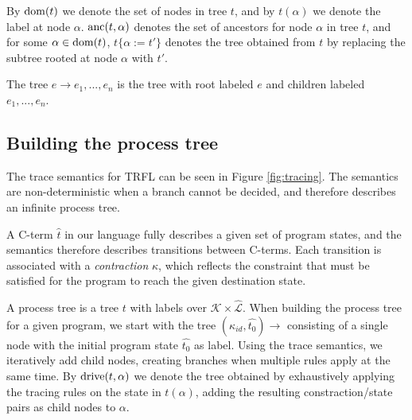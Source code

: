 \documentclass[10pt]{../sigplanconf}
\newcommand{\dom}{\ensuremath{{\rm dom}}}
\begin{document}
By $\dom(t)$ we denote the set of nodes in tree $t$, and by
$t(\alpha)$ we denote the label at node $\alpha$. ${\rm anc}(t,
\alpha)$ denotes the set of ancestors for node $\alpha$ in tree $t$,
and for some $\alpha \in \dom(t)$, $t\{\alpha := t'\}$ denotes the
tree obtained from $t$ by replacing the subtree rooted at node
$\alpha$ with $t'$.

The tree $e \rightarrow e_1, ..., e_n$ is the tree with root labeled
$e$ and children labeled $e_1, ..., e_n$.

\subsection{Building the process tree}
The trace semantics for TRFL can be seen in Figure
\ref{fig:tracing}. The semantics are non-deterministic when a branch
cannot be decided, and therefore describes an infinite process tree.

A C-term $\widehat{t}$ in our language fully describes a given set of
program states, and the semantics therefore describes transitions
between C-terms. Each transition is associated with a
\emph{contraction} $\kappa$, which reflects the constraint that must
be satisfied for the program to reach the given destination state.

A process tree is a tree $t$ with labels over $\mathcal{K} \times
\widehat{\mathcal{L}}$. When building the process tree for a given
program, we start with the tree $(\kappa_{id}, \widehat{t_0})
\rightarrow$ consisting of a single node with the initial program
state $\widehat{t_0}$ as label. Using the trace semantics, we
iteratively add child nodes, creating branches when multiple rules
apply at the same time. By ${\rm drive}(t, \alpha)$ we denote the tree
obtained by exhaustively applying the tracing rules on the state in
$t(\alpha)$, adding the resulting constraction/state pairs as child
nodes to $\alpha$.
\end{document}
